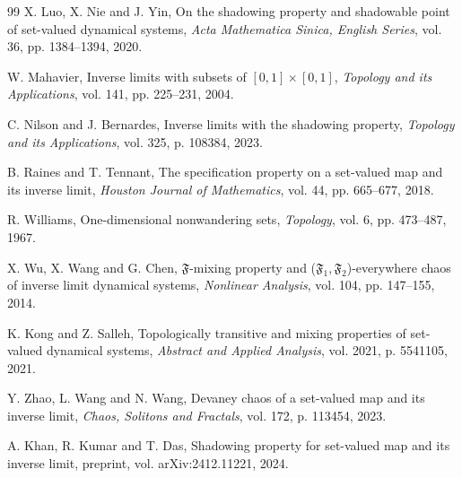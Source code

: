 \documentclass[12pt]{amsart}
\theoremstyle{definition}
\begin{document}
\begin{thebibliography}{99}
	X. Luo, X. Nie and J. Yin,
	On the shadowing property and shadowable point of set-valued dynamical systems,
	\textit{Acta Mathematica Sinica, English Series},
	vol. 36, pp. 1384--1394, 2020.
	
	W. Mahavier,
	Inverse limits with subsets of $[0,1]\times[0,1]$,
	\textit{Topology and its Applications},
	vol. 141, pp. 225--231, 2004.
	
	C. Nilson and J. Bernardes,
	Inverse limits with the shadowing property,
	\textit{Topology and its Applications},
	vol. 325, p. 108384, 2023.
	
	B. Raines and T. Tennant,
	The specification property on a set-valued map and its inverse limit,
	\textit{Houston Journal of Mathematics},
	vol. 44, pp. 665--677, 2018.
	
	R. Williams,
	One-dimensional nonwandering sets,
	\textit{Topology},
	vol. 6, pp. 473--487, 1967.
	
	X. Wu, X. Wang and G. Chen,
	$\mathfrak{F}$-mixing property and ($\mathfrak{F}_1,\mathfrak{F}_2$)-everywhere chaos of inverse limit dynamical systems,
	\textit{Nonlinear Analysis},
	vol. 104, pp. 147--155, 2014.
	
	K. Kong and Z. Salleh,
	Topologically transitive and mixing properties of set-valued dynamical systems,
	\textit{Abstract and Applied Analysis},
	vol. 2021, p. 5541105, 2021.
	
	Y. Zhao, L. Wang and N. Wang,
	Devaney chaos of a set-valued map and its inverse limit,
	\textit{Chaos, Solitons and Fractals},
	vol. 172, p. 113454, 2023.
	
	A. Khan, R. Kumar and T. Das,
	Shadowing property for set-valued map and its inverse limit,
	preprint, vol. arXiv:2412.11221, 2024.
	
\end{thebibliography}
\end{document}
